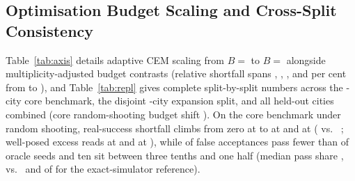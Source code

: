 \begin{table}[tbp]
\caption{Sixfold extended one-step training control (\SizeM{} full-data model trained for \ExtTrSamples{} examples, \ExtTrEpochs{} epochs) compared against the primary two-epoch \SizeM{} checkpoint and the exact-simulator reference. First panel tracks held-out test variational ELBO (nats/transition), short-horizon F1, \RollA-month scalar errors, \Horizon-month spatial-overlay copy-error ratios, open-loop powered-zone MAE (copying incurs \HorPowCopy{} tiles; engine cross-seed spread \HorPowEng{}), \AllCities-city single-plan ($B ={}$) excess and false rejection/self-acceptance, and SHA-256 prefixes across milestones. Second panel reports pooled paired planning audits across all \AllCities{} held-out cities (\AllInstances{} instances) and at $B ={}$ on the \HeldOutFamilies-city core (\MainInstances{} instances). Third panel disaggregates $B ={}$ adaptive CEM by task family across the \MainInstances{} core instances. Fourth panel disaggregates \RlMonths-step in-imagination PPO across \emph{treasury}, the four spatial task families, and all five families combined (\CILevel{} per cent city-cluster BCa intervals).}
\label{tab:extended}
\centering\scriptsize

\end{table}

\subsection{Optimisation Budget Scaling and Cross-Split Consistency}\label{app:axis}

Table~\ref{tab:axis} details adaptive CEM scaling from $B ={}$ to $B ={}$ alongside multiplicity-adjusted budget contrasts (relative shortfall spans \PaRelShortTen{}, \PaRelShortHund{}, \PaRelShortThou{}, and \PaRelShortTenThou{} per cent from  to ), and Table~\ref{tab:repl} gives complete split-by-split numbers across the \HeldOutFamilies-city core benchmark, the disjoint \XCities-city expansion split, and all \AllCities{} held-out cities combined (core random-shooting budget shift \ReplRandRiseForty{} \ci{\ReplRandRiseFortyCI}). On the core benchmark under random shooting, real-success shortfall climbs from zero at  to \RandTenShort{} at  and \RandThouShort{} at  (\RandThouOrAcc{} \ci{\RandThouOrAccCI} vs.\ \RandThouPerfOrAcc{} \ci{\RandThouPerfOrAccCI}; well-posed excess reads \RandOneWPDiff{} at  and \RandThouWPDiff{} \ci{\RandThouWPDiffCI} at ), while \DepthRandLow{} of \DepthRandN{} false acceptances pass fewer than \DepthCut{} of oracle seeds and ten sit between three tenths and one half (median pass share \DepthRandMedian{}, vs.\ \DepthRandPerfMedian{} and \DepthRandPerfLow{} of \DepthRandPerfN{} for the exact-simulator reference).

